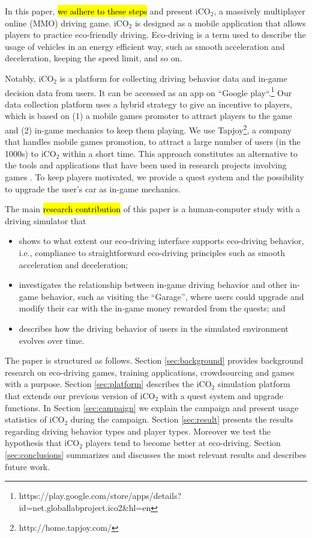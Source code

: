 \documentclass[preprint,authoryear,12pt]{elsarticle}
\begin{document}
In this paper, \hl{we adhere to these steps} and present iCO$_2$, a massively multiplayer online (MMO) driving game. iCO$_2$ is designed as a mobile application that allows players to practice eco-friendly driving. Eco-driving is a term used to describe the usage of vehicles in an energy efficient way, such as smooth acceleration and deceleration, keeping the speed limit, and so on.

Notably, iCO$_2$ is a platform for collecting driving behavior data and in-game decision data from users. It can be accessed as an app on ``Google play``.\footnote{https://play.google.com/store/apps/details?id=net.globallabproject.ico2\&hl=en}
Our data collection platform uses a hybrid strategy to give an incentive to players, which is based on (1) a mobile games promoter to attract players to the game and (2) in-game mechanics to keep them playing. We use Tapjoy\footnote{http://home.tapjoy.com/}, %
a company that handles mobile games promotion, to attract a large number of users (in the 1000s) to iCO$_2$ within a short time. This approach constitutes an alternative to the tools and applications that have been used in research projects involving games \citep{kittur2008crowdsourcing,Biewald:2012,ChanH12}.
To keep players motivated, we provide a quest system and the possibility to upgrade the user's car as in-game mechanics.

The main \hl{research contribution} of this paper is a human-computer study with a driving simulator that
\begin{itemize}
\item shows to what extent our eco-driving interface supports eco-driving behavior, i.e., compliance to straightforward eco-driving principles such as smooth acceleration and deceleration;
\item investigates the relationship between in-game driving behavior and other in-game behavior, such as visiting the ``Garage'', where users could upgrade and modify their car with the in-game money rewarded from the quests; and
\item describes how the driving behavior of users in the simulated environment evolves over time.
\end{itemize}


The paper is structured as follows.
Section \ref{sec:background} provides background research on eco-driving games, training applications, crowdsourcing and games with a purpose.
Section \ref{sec:platform} describes the iCO$_2$ simulation platform that extends our previous version of iCO$_2$
\citep{prendingeroliveira2014} with a quest system and upgrade functions.
In Section \ref{sec:campaign} we explain the campaign and present usage statistics of iCO$_2$ during the campaign.
Section \ref{sec:result} presents the results regarding driving behavior types and player types.  Moreover we test the hypothesis that iCO$_2$ players tend to become better at eco-driving.
Section \ref{sec:conclusions} summarizes and discusses the most relevant results and describes future work.
\end{document}
